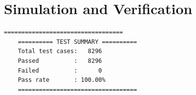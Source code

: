 \section{Simulation and Verification}

\begin{lstlisting}[style=StyleResult, language=Result]
	==================================
	========== TEST SUMMARY ==========
	Total test cases:   8296
	Passed          :   8296
	Failed          :      0
	Pass rate       : 100.00%
	==================================
\end{lstlisting}